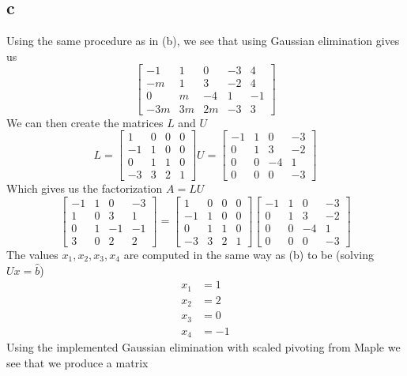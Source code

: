 \documentclass[12pt]{article}
\begin{document}
\subsection*{c}
Using the same procedure as in (b), we see that using Gaussian elimination gives us
$$
\begin{bmatrix}
-1 & 1 & 0 & -3 & 4\\
-m & 1 & 3 & -2 & 4\\
0 & m & -4 & 1 & -1\\
-3m & 3m & 2m & -3 & 3
\end{bmatrix}
$$
We can then create the matrices $L$ and $U$
$$
L
=
\begin{bmatrix}
1 & 0 & 0 & 0\\
-1 & 1 & 0 & 0 \\
0 & 1 & 1 & 0 \\
-3 & 3 & 2 & 1
\end{bmatrix}
U
=
\begin{bmatrix}
-1 & 1 & 0 & -3\\
0 & 1 & 3 & -2 \\
0 & 0 & -4 & 1 \\
0 & 0 & 0 & -3
\end{bmatrix}
$$
Which gives us the factorization $A=LU$
$$
\begin{bmatrix}
-1 & 1 & 0 & -3\\
1 & 0 & 3 & 1 \\
0 & 1 & -1 & -1 \\
3 & 0 & 2 & 2
\end{bmatrix}
=
\begin{bmatrix}
1 & 0 & 0 & 0\\
-1 & 1 & 0 & 0 \\
0 & 1 & 1 & 0 \\
-3 & 3 & 2 & 1
\end{bmatrix}
\begin{bmatrix}
-1 & 1 & 0 & -3\\
0 & 1 & 3 & -2 \\
0 & 0 & -4 & 1 \\
0 & 0 & 0 & -3
\end{bmatrix}
$$
The values $x_1,x_2,x_3,x_4$ are computed in the same way as (b) to be (solving $Ux=\hat{b}$)
\begin{align*}
x_1&=1 \\
x_2&=2 \\
x_3&=0 \\
x_4&=-1
\end{align*}
Using the implemented Gaussian elimination with scaled pivoting from Maple we see that we produce a matrix
\end{document}
